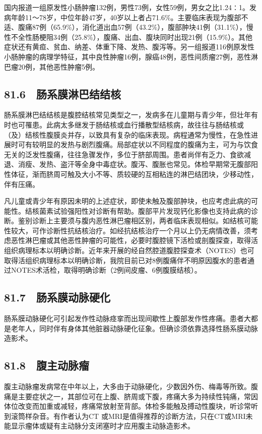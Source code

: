 国内报道一组原发性小肠肿瘤132例，男性73例，女性59例，男女之比1.24∶1。发病年龄11～78岁，中位年龄47岁，40岁以上者占71.6\%。主要临床表现为腹部不适、腹痛87例（65.9\%），消化道出血57例（43.2\%），腹部肿块41例（31.1\%），慢性不全性肠梗阻34例（25.8\%），腹痛、出血、腹块同时出现21例（15.9\%）。其他症状还有黄疸、贫血、纳差、体重下降、发热、腹泻等。另一组报道116例原发性小肠肿瘤的病理学特征，其中良性肿瘤16例，腺癌48例，恶性间质瘤27例，恶性淋巴瘤20例，其他恶性肿瘤5例。

\subsection{81.6　肠系膜淋巴结结核}

肠系膜淋巴结结核是腹腔结核常见类型之一，发病多在儿童期与青少年，但壮年有时也可罹患。此病太多继发于肠结核或血行播散型结核病，故往往与肠结核或（及）结核性腹膜炎并存，以致具有复杂的临床表现。病程通常为慢性，在急性进展时可有较明显的发热与剧烈腹痛。局部症状以不同程度的腹痛为主，可为与饮食无关的泛发性腹痛，往往急骤发作，多位于脐部周围。患者尚伴有乏力、食欲减退、消瘦、发热、盗汗等全身中毒症状。腹泻、腹胀也常见。体检早期常无腹部阳性体征，渐而脐周可触及大小不等、质较硬的互相粘连的淋巴结团块，少移动性，伴有压痛。

凡儿童或青少年有原因未明的上述症状，即使未触及腹部肿块，也应考虑此病的可能性。结核菌素试验强阳性对诊断有帮助。腹部平片发现钙化影像也支持此病的诊断。鉴别诊断上主要须与腹内恶性淋巴瘤相区别，两者临床表现相似。如结核可能性较大，可作诊断性抗结核治疗。如经抗结核治疗一个月以上仍无病情改善，须考虑恶性淋巴瘤或其他恶性肿瘤的可能性，必要时腹腔镜下活检或剖腹探查，取得活组织病理标本以明确诊断。近年来开展的经自然腔道腹腔探查术（NOTES）也可取得活组织病理标本以明确诊断，我院目前已对8例腹痛伴不明原因腹水的患者通过NOTES术活检，取得明确诊断（2例间皮瘤、6例腹膜结核）。

\subsection{81.7　肠系膜动脉硬化}

肠系膜动脉硬化可引起发作性动脉痉挛而出现间歇性上腹部发作性疼痛。患者大都是老年人，同时伴有身体其他脏器动脉硬化征象。但确诊须依靠选择性肠系膜动脉造影术。

\subsection{81.8　腹主动脉瘤}

腹主动脉瘤发病常在中年以上，大多由于动脉硬化，少数因外伤、梅毒等所致。腹痛是主要症状之一，其部位可在上腹、脐周或下腹，疼痛大多为持续性钝痛，常因体位改变而加重或减轻，疼痛常放射至背部。体检多能触及搏动性腹块，听诊常听到滚筒样杂音。有作者认为CT
或MRI是值得推荐的诊断方法，只在CT或MRI未能显示瘤体或疑有主动脉分支闭塞时才应用腹主动脉造影术。

